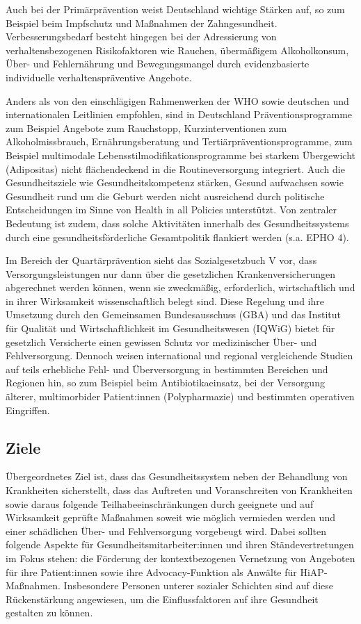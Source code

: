\documentclass{article}
\begin{document}
Auch bei der Primärprävention weist Deutschland wichtige Stärken auf, so zum Beispiel beim Impfschutz und Maßnahmen der Zahngesundheit. Verbesserungsbedarf besteht hingegen bei der Adressierung von verhaltensbezogenen Risikofaktoren wie Rauchen, übermäßigem Alkoholkonsum, Über- und Fehlernährung und Bewegungsmangel durch evidenzbasierte individuelle verhaltenspräventive Angebote.


Anders als von den einschlägigen Rahmenwerken der WHO sowie deutschen und internationalen Leitlinien empfohlen, sind in Deutschland Präventionsprogramme zum Beispiel Angebote zum Rauchstopp, Kurzinterventionen zum Alkoholmissbrauch, Ernährungsberatung und Tertiärpräventionsprogramme, zum Beispiel multimodale Lebensstilmodifikationsprogramme bei starkem Übergewicht (Adipositas) nicht flächendeckend in die Routineversorgung integriert. Auch die Gesundheitsziele wie Gesundheitskompetenz stärken, Gesund aufwachsen sowie Gesundheit rund um die Geburt werden nicht ausreichend durch politische Entscheidungen im Sinne von Health in all Policies unterstützt. Von zentraler Bedeutung ist zudem, dass solche Aktivitäten innerhalb des Gesundheitssystems durch eine gesundheitsförderliche Gesamtpolitik flankiert werden (s.a. EPHO 4). 


Im Bereich der Quartärprävention sieht das Sozialgesetzbuch V vor, dass Versorgungsleistungen nur dann über die gesetzlichen Krankenversicherungen abgerechnet werden können, wenn sie zweckmäßig, erforderlich, wirtschaftlich und in ihrer Wirksamkeit wissenschaftlich belegt sind. Diese Regelung und ihre Umsetzung durch den Gemeinsamen Bundesausschuss (GBA) und das Institut für Qualität und Wirtschaftlichkeit im Gesundheitswesen (IQWiG) bietet für gesetzlich Versicherte einen gewissen Schutz vor medizinischer Über- und Fehlversorgung. Dennoch weisen international und regional vergleichende Studien auf teils erhebliche Fehl- und Überversorgung in bestimmten Bereichen und Regionen hin, so zum Beispiel beim Antibiotikaeinsatz, bei der Versorgung älterer, multimorbider Patient:innen (Polypharmazie) und bestimmten operativen Eingriffen.


\subsection{Ziele }\label{H6203864}



Übergeordnetes Ziel ist, dass das Gesundheitssystem neben der Behandlung von Krankheiten sicherstellt, dass das Auftreten und Voranschreiten von Krankheiten sowie daraus folgende Teilhabeeinschränkungen durch geeignete und auf Wirksamkeit geprüfte Maßnahmen soweit wie möglich vermieden werden und einer schädlichen Über- und Fehlversorgung vorgebeugt wird. Dabei sollten folgende Aspekte für Gesundheitsmitarbeiter:innen und ihren Ständevertretungen im Fokus stehen: die Förderung der kontextbezogenen Vernetzung von Angeboten für ihre Patient:innen sowie ihre Advocacy-Funktion als Anwälte für HiAP-Maßnahmen. Insbesondere Personen unterer sozialer Schichten sind auf diese Rückenstärkung angewiesen, um die Einflussfaktoren auf ihre Gesundheit gestalten zu können.
\end{document}
